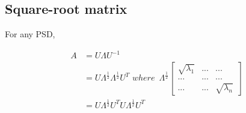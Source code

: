 \subsection{Square-root matrix}

For any PSD,

\begin{align*}
A &= U\Lambda U^{-1} \\
&=U\Lambda^{\frac{1}{2}}\Lambda^{\frac{1}{2}}U^{T}\,\, where \,\,\, \Lambda^{\frac{1}{2}}
\begin{bmatrix}%
\sqrt{\lambda_1}&...&...\\
...&...&...\\
...&...&\sqrt{\lambda_n}
\end{bmatrix}\\
&= U\Lambda^{\frac{1}{2}}U^TU\Lambda^{\frac{1}{2}}U^T
\end{align*}

























